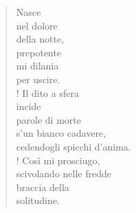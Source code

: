 
\begin{verse}
Nasce\\
nel dolore\\
della notte,\\
prepotente\\
mi dilania\\
per uscire.\\!
Il dito a sfera\\
incide\\
parole di morte\\
s'un bianco cadavere,\\
cedendogli spicchi d'anima.\\!
Così mi prosciugo,\\
scivolando nelle fredde\\
braccia della\\
solitudine.
\end{verse}